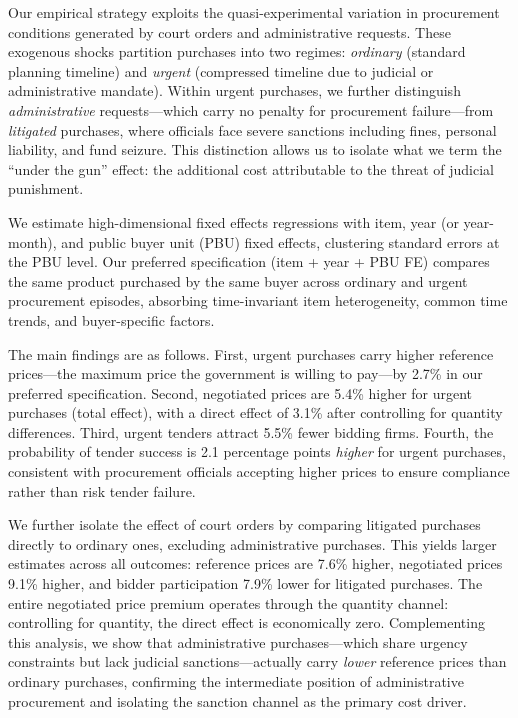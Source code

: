 Our empirical strategy exploits the quasi-experimental variation in procurement conditions generated by court orders and administrative requests. These exogenous shocks partition purchases into two regimes: \textit{ordinary} (standard planning timeline) and \textit{urgent} (compressed timeline due to judicial or administrative mandate). Within urgent purchases, we further distinguish \textit{administrative} requests---which carry no penalty for procurement failure---from \textit{litigated} purchases, where officials face severe sanctions including fines, personal liability, and fund seizure. This distinction allows us to isolate what we term the ``under the gun'' effect: the additional cost attributable to the threat of judicial punishment.

We estimate high-dimensional fixed effects regressions with item, year (or year-month), and public buyer unit (PBU) fixed effects, clustering standard errors at the PBU level. Our preferred specification (item + year + PBU FE) compares the same product purchased by the same buyer across ordinary and urgent procurement episodes, absorbing time-invariant item heterogeneity, common time trends, and buyer-specific factors.

The main findings are as follows. First, urgent purchases carry higher reference prices---the maximum price the government is willing to pay---by 2.7\% in our preferred specification. Second, negotiated prices are 5.4\% higher for urgent purchases (total effect), with a direct effect of 3.1\% after controlling for quantity differences. Third, urgent tenders attract 5.5\% fewer bidding firms. Fourth, the probability of tender success is 2.1 percentage points \textit{higher} for urgent purchases, consistent with procurement officials accepting higher prices to ensure compliance rather than risk tender failure.

We further isolate the effect of court orders by comparing litigated purchases directly to ordinary ones, excluding administrative purchases. This yields larger estimates across all outcomes: reference prices are 7.6\% higher, negotiated prices 9.1\% higher, and bidder participation 7.9\% lower for litigated purchases. The entire negotiated price premium operates through the quantity channel: controlling for quantity, the direct effect is economically zero. Complementing this analysis, we show that administrative purchases---which share urgency constraints but lack judicial sanctions---actually carry \textit{lower} reference prices than ordinary purchases, confirming the intermediate position of administrative procurement and isolating the sanction channel as the primary cost driver.

